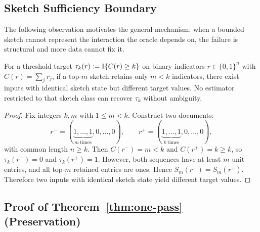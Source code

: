 \subsection{Sketch Sufficiency Boundary}\label{app:proof-m-lt-k}

The following observation motivates the general mechanism: when a bounded sketch cannot represent the interaction the oracle depends on, the failure is structural and more data cannot fix it.

\begin{proposition}\label{prop:m_lt_k}
For a threshold target $\tau_k(r) := \mathbb{I}\{C(r) \ge k\}$ on binary indicators $r \in \{0,1\}^n$ with $C(r) = \sum_j r_j$, if a top-$m$ sketch retains only $m < k$ indicators, there exist inputs with identical sketch state but different target values. No estimator restricted to that sketch class can recover $\tau_k$ without ambiguity.
\end{proposition}

\begin{proof}
Fix integers $k,m$ with $1 \le m < k$.
Construct two documents:
\[
r^{-} = (\underbrace{1,\dots,1}_{m\ \text{times}}, 0, \dots, 0), \qquad
r^{+} = (\underbrace{1,\dots,1}_{k\ \text{times}}, 0, \dots, 0),
\]
with common length $n \ge k$. Then $C(r^-) = m < k$ and $C(r^+) = k \ge k$, so
$\tau_k(r^-) = 0$ and $\tau_k(r^+) = 1$.
However, both sequences have at least $m$ unit entries, and all top-$m$ retained entries are ones.
Hence $S_m(r^-) = S_m(r^+)$.
Therefore two inputs with identical sketch state yield different target values.
\end{proof}

\subsection{Proof of Theorem~\ref{thm:one-pass} (Preservation)}\label{app:proof-preservation}

